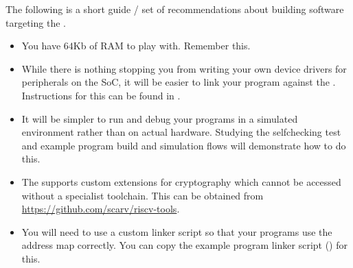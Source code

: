 
The following is a short guide / set of recommendations about building
software targeting the \SCARVSOC.

\begin{itemize}

\item You have $64$Kb of RAM to play with. Remember this.

\item While there is nothing stopping you from writing your own
    device drivers for peripherals on the SoC, it will be easier
    to link your program against the \SCARVSOC.
    Instructions for this can be found in .

\item It will be simpler to run and debug your programs in a simulated
    environment rather than on actual hardware.
    Studying the selfchecking test and example program build and
    simulation flows will demonstrate how to do this.

\item The \SCARVCPU supports custom extensions for cryptography
    which cannot be accessed without a specialist toolchain.
    This can be obtained from
    \url{https://github.com/scarv/riscv-tools}.

\item You will need to use a custom linker script so that your programs
    use the \SCARVSOC address map correctly.
    You can copy the example program linker script
    ()
    for this.

\end{itemize}

